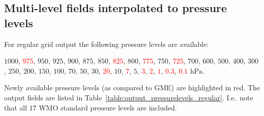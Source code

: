 \subsection{Multi-level fields interpolated to pressure levels}

\newcommand{\pressurelevelsTriangular}{$1000$, $950$, $850$, $700$, $500$, $300$ $\mathrm{hPa}$}

\newcommand{\new}[1]{\textcolor{red}{#1}}
\newcommand{\pressurelevelsRegular}{$1000$, \new{$975$}, $950$, $925$, $900$, 
                                    $875$, $850$, \new{$825$}, $800$, 
                                    \new{$775$}, $750$, \new{$725$}, $700$, $600$, 
                                    $500$, $400$, $300$, $250$, $200$, $150$, $100$, 
                                    $70$, $50$, $30$, \new{$20$}, $10$, 
                                    \new{$7$}, $5$, \new{$3$}, 
                                    \new{$2$}, \new{$1$}, 
                                     \new{$0.3$}, \new{$0.1$} $\mathrm{hPa}$}

For regular grid output the following pressure levels are available: 
\begin{center}
\begin{minipage}{0.5\linewidth}
\pressurelevelsRegular. 
\end{minipage}
\end{center}


Newly available pressure levels (as compared to GME) are highlighted in red. 
The output fields are listed in Table~\ref{table:output_pressurelevels_regular}.
I.e.\ note that all $17$ WMO standard pressure levels are included.

